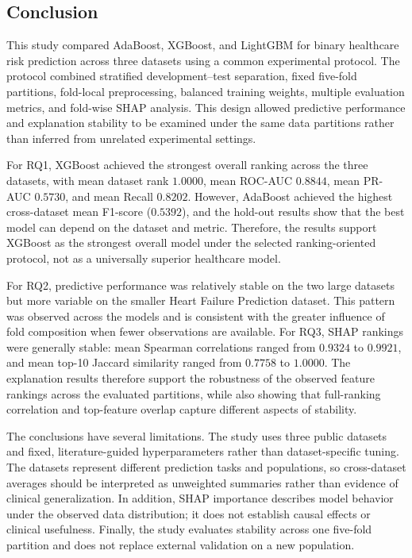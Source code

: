 \subsection{Conclusion}

This study compared AdaBoost, XGBoost, and LightGBM for binary healthcare risk prediction across three datasets using a common experimental protocol. The protocol combined stratified development--test separation, fixed five-fold partitions, fold-local preprocessing, balanced training weights, multiple evaluation metrics, and fold-wise SHAP analysis. This design allowed predictive performance and explanation stability to be examined under the same data partitions rather than inferred from unrelated experimental settings.

For RQ1, XGBoost achieved the strongest overall ranking across the three datasets, with mean dataset rank $1.0000$, mean ROC-AUC $0.8844$, mean PR-AUC $0.5730$, and mean Recall $0.8202$. However, AdaBoost achieved the highest cross-dataset mean F1-score ($0.5392$), and the hold-out results show that the best model can depend on the dataset and metric. Therefore, the results support XGBoost as the strongest overall model under the selected ranking-oriented protocol, not as a universally superior healthcare model.

For RQ2, predictive performance was relatively stable on the two large datasets but more variable on the smaller Heart Failure Prediction dataset. This pattern was observed across the models and is consistent with the greater influence of fold composition when fewer observations are available. For RQ3, SHAP rankings were generally stable: mean Spearman correlations ranged from $0.9324$ to $0.9921$, and mean top-10 Jaccard similarity ranged from $0.7758$ to $1.0000$. The explanation results therefore support the robustness of the observed feature rankings across the evaluated partitions, while also showing that full-ranking correlation and top-feature overlap capture different aspects of stability.

The conclusions have several limitations. The study uses three public datasets and fixed, literature-guided hyperparameters rather than dataset-specific tuning. The datasets represent different prediction tasks and populations, so cross-dataset averages should be interpreted as unweighted summaries rather than evidence of clinical generalization. In addition, SHAP importance describes model behavior under the observed data distribution; it does not establish causal effects or clinical usefulness. Finally, the study evaluates stability across one five-fold partition and does not replace external validation on a new population.

